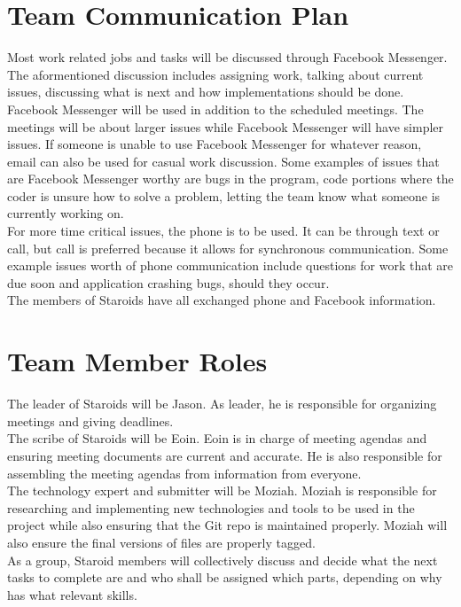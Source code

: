 \documentclass{article}
\begin{document}
\section{Team Communication Plan}
Most work related jobs and tasks will be discussed through Facebook Messenger. The aformentioned discussion includes assigning work, talking about current issues, discussing what is next and how implementations should be done. Facebook Messenger will be used in addition to the scheduled meetings. The meetings will be about larger issues while Facebook Messenger will have simpler issues. If someone is unable to use Facebook Messenger for whatever reason, email can also be used for casual work discussion. Some examples of issues that are Facebook Messenger worthy are bugs in the program, code portions where the coder is unsure how to solve a problem, letting the team know what someone is currently working on.\\
For more time critical issues, the phone is to be used. It can be through text or call, but call is preferred because it allows for synchronous communication. Some example issues worth of phone communication include questions for work that are due soon and application crashing bugs, should they occur.\\
The members of Staroids have all exchanged phone and Facebook information.\\

\section{Team Member Roles}
The leader of Staroids will be Jason. As leader, he is responsible for organizing meetings and giving deadlines.\\
The scribe of Staroids will be Eoin. Eoin is in charge of meeting agendas and ensuring meeting documents are current and accurate. He is also responsible for assembling the meeting agendas from information from everyone.\\
The technology expert and submitter will be Moziah. Moziah is responsible for researching and implementing new technologies and tools to be used in the project while also ensuring that the Git repo is maintained properly. Moziah will also ensure the final versions of files are properly tagged.\\
As a group, Staroid members will collectively discuss and decide what the next tasks to complete are and who shall be assigned which parts, depending on why has what relevant skills.
\end{document}
